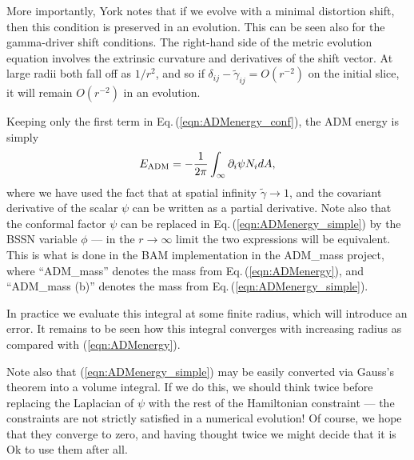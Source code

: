 \documentclass[12pt]{article}
\begin{document}
More importantly, York notes that if we evolve with a minimal distortion shift, 
then this condition is preserved in an evolution. This can be seen also
for the gamma-driver shift conditions. The right-hand side of the metric evolution 
equation involves the extrinsic curvature and derivatives of the shift vector.
At large radii both fall off as $1/r^2$, and so if 
$\delta_{ij} - \tilde{\gamma}_{ij} = O(r^{-2})$ on the initial slice, it will
remain $O(r^{-2})$ in an evolution. 


Keeping only the first term in Eq.\,(\ref{eqn:ADMenergy_conf}), the ADM energy is 
 simply 
%
\begin{equation}
E_{\rm ADM} = - \frac{1}{2\pi} \int_{\infty}
 \partial_i \psi N_i dA, \label{eqn:ADMenergy_simple}
\end{equation}
%
where we have used the fact that at spatial infinity 
$\tilde{\gamma} \rightarrow 1$, and the covariant derivative of 
the scalar $\psi$ can be written as a partial derivative. Note
also that the conformal factor $\psi$ can be replaced in 
Eq.\,(\ref{eqn:ADMenergy_simple}) by the BSSN variable $\phi$ 
--- in the $r \rightarrow \infty$ limit the two expressions will be 
equivalent. This is what is done in the BAM implementation in the 
ADM\_mass project, where ``ADM\_mass'' denotes the mass from 
Eq.\,(\ref{eqn:ADMenergy}), and ``ADM\_mass (b)'' denotes the
mass from Eq.\,(\ref{eqn:ADMenergy_simple}).

In practice we evaluate this integral at some finite radius, which
will introduce an error. It remains to be seen how this integral
converges with increasing radius as compared with (\ref{eqn:ADMenergy}). 

Note also that (\ref{eqn:ADMenergy_simple}) may be easily converted
via Gauss's theorem into a volume integral. If we do this, we should
think twice before replacing the Laplacian of $\psi$ with the
rest of the Hamiltonian constraint --- the constraints are not strictly
satisfied in a numerical evolution! Of course, we hope that they converge
to zero, and having thought twice we might decide that it is Ok to use
them after all. 



\end{document}

